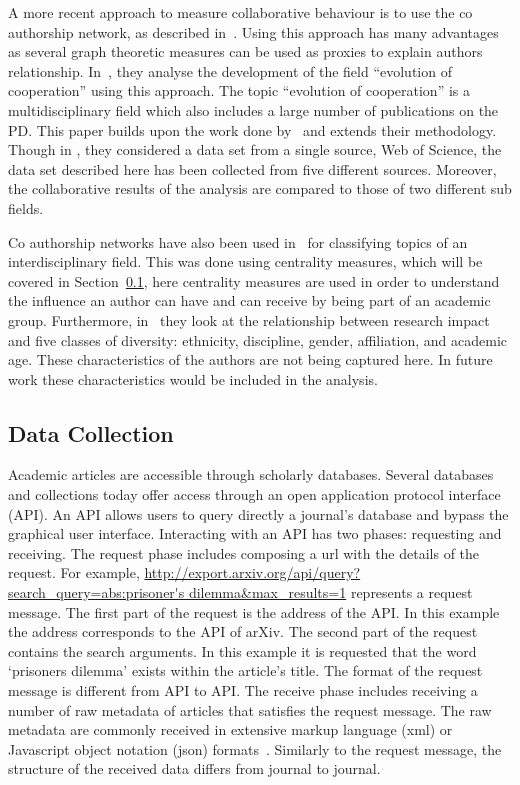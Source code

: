 \documentclass{article}
\theoremstyle{definition}
\begin{document}
A more recent approach to measure collaborative behaviour is to use the co
authorship network, as described in~\cite{Liu2015}. Using this approach has many
advantages as several graph theoretic measures can be used as proxies to explain
authors relationship. In~\cite{Liu2015}, they analyse the development of the
field ``evolution of cooperation'' using this approach. The topic ``evolution of
cooperation'' is a multidisciplinary field which also includes a large number of
publications on the PD. This paper builds upon the work done
by~\cite{Liu2015} and extends their methodology. Though in \cite{Liu2015}, they
considered a data set from a single source, Web of Science, the data set
described here has been collected from five different sources. Moreover, the
collaborative results of the analysis are compared to those of two different sub
fields.

Co authorship networks have also been used in~\cite{youngblood2018} for
classifying topics of an interdisciplinary field. This was done using centrality
measures, which will be covered in Section~\ref{section:data_collection}, here
centrality measures are used in order to understand the influence an author can
have and can receive by being part of an academic group. Furthermore,
in~\cite{alshebli2018} they look at the relationship between research impact and
five classes of diversity: ethnicity, discipline, gender, affiliation, and
academic age. These characteristics of the authors are not being captured here.
In future work these characteristics would be included in the analysis.

\subsection{Data Collection}\label{section:data_collection}

Academic articles are accessible through scholarly databases. Several databases
and collections today offer access through an open application protocol
interface (API). An API allows users to query directly a journal's database and
bypass the graphical user interface. Interacting with an API has two phases:
requesting and receiving. The request phase includes composing a url with the
details of the request. For example,
\url{http://export.arxiv.org/api/query?search_query=abs:prisoner's
dilemma&max_results=1} represents a request message. The first part of the
request is the address of the API. In this example the address corresponds to
the API of arXiv. The second part of the request contains the search arguments.
In this example it is requested that the word `prisoners dilemma' exists within
the article's title. The format of the request message is different from API to
API. The receive phase includes receiving a number of raw metadata of articles
that satisfies the request message. The raw metadata are commonly received in
extensive markup language (xml) or Javascript object notation (json)
formats~\cite{nurseitov2009}. Similarly to the request message, the structure of
the received data differs from journal
to journal.
\end{document}
